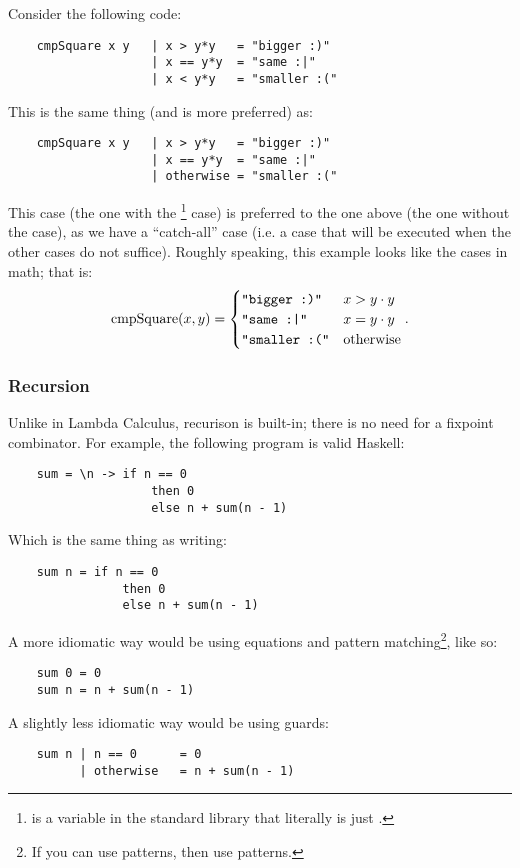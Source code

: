 \documentclass[letterpaper]{article}
\begin{document}
\bigskip 

Consider the following code: 
\begin{verbatim}
    cmpSquare x y   | x > y*y   = "bigger :)"
                    | x == y*y  = "same :|"
                    | x < y*y   = "smaller :("\end{verbatim}
This is the same thing (and is more preferred) as:
\begin{verbatim}
    cmpSquare x y   | x > y*y   = "bigger :)"
                    | x == y*y  = "same :|"
                    | otherwise = "smaller :("\end{verbatim}
This case (the one with the \footnote{ is a variable in the standard library that literally is just .} case) is preferred to the one above (the one without the  case), as we have a ``catch-all'' case (i.e. a case that will be executed when the other cases do not suffice). Roughly speaking, this example looks like the cases in math; that is: 
\[\text{cmpSquare}(x, y) = \begin{cases}
    \texttt{"bigger :)"} & x > y \cdot y \\ 
    \texttt{"same :|"} & x = y \cdot y \\ 
    \texttt{"smaller :("} & \text{otherwise}
\end{cases}.\]

\subsubsection{Recursion}
Unlike in Lambda Calculus, recurison is built-in; there is no need for a fixpoint combinator. For example, the following program is valid Haskell:
\begin{verbatim}
    sum = \n -> if n == 0 
                    then 0 
                    else n + sum(n - 1)
\end{verbatim}
Which is the same thing as writing: 
\begin{verbatim}
    sum n = if n == 0 
                then 0 
                else n + sum(n - 1)
\end{verbatim}
A more idiomatic way would be using equations and pattern matching\footnote{If you can use patterns, then use patterns.}, like so:
\begin{verbatim}
    sum 0 = 0
    sum n = n + sum(n - 1)
\end{verbatim}
A slightly less idiomatic way would be using guards: 
\begin{verbatim}
    sum n | n == 0      = 0
          | otherwise   = n + sum(n - 1)
\end{verbatim}
\end{document}
